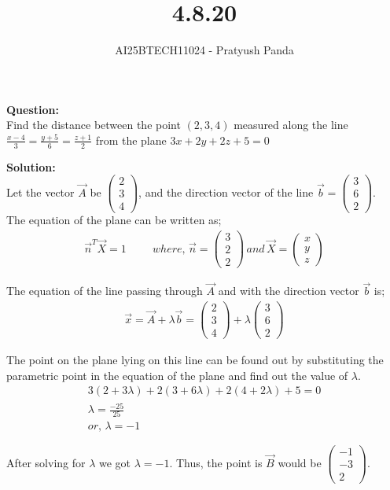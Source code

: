 \documentclass{beamer}
\title{4.8.20}
\author{AI25BTECH11024 - Pratyush Panda}
\providecommand{\brak}[1]{\ensuremath{\left(#1\right)}}
\theoremstyle{remark}
\newcommand{\myvec}[1]{\ensuremath{\begin{pmatrix}#1\end{pmatrix}}}
\numberwithin{equation}{section}
\begin{document}
\maketitle

\begin{frame}
\textbf{Question: } \\
Find the distance between the point $\brak{2,3,4}$ measured along the line $\frac{x-4}{3}=\frac{y+5}{6}=\frac{z+1}{2}$ from the plane $3x+2y+2z+5=0$
\end{frame}

\begin{frame}
\textbf{Solution: } \\
Let the vector $\Vec{A}$ be $\myvec{2 \\ 3 \\ 4}$, and the direction vector of the line $\Vec{b}=\myvec{3 \\ 6 \\ 2}$. \\
The equation of the plane can be written as;
\begin{align}
\Vec{n}^T\Vec{X}=1 \hspace{1cm} where, \, \Vec{n}=\myvec{3 \\ 2 \\ 2} \, and \, \Vec{X}=\myvec{x \\ y \\ z}
\end{align}

The equation of the line passing through $\Vec{A}$ and with the direction vector $\Vec{b}$ is;
\begin{align}   
\Vec{x}=\Vec{A}+\lambda\Vec{b}=\myvec{2 \\ 3 \\ 4}+\lambda\myvec{3 \\ 6 \\ 2}
\end{align}
\end{frame}

\begin{frame}
The point on the plane lying on this line can be found out by substituting the parametric point in the equation of the plane and find out the value of $\lambda$. \\
\begin{align}
3(2+3\lambda)+2(3+6\lambda)+2(4+2\lambda)+5=0 \\
\lambda=\frac{-25}{25} \\
or, \, \lambda=-1
\end{align}

After solving for $\lambda$ we got $\lambda=-1$. Thus, the point is $\Vec{B}$ would be $\myvec{-1 \\ -3 \\ 2}$. \\
\end{frame}
\end{document}
